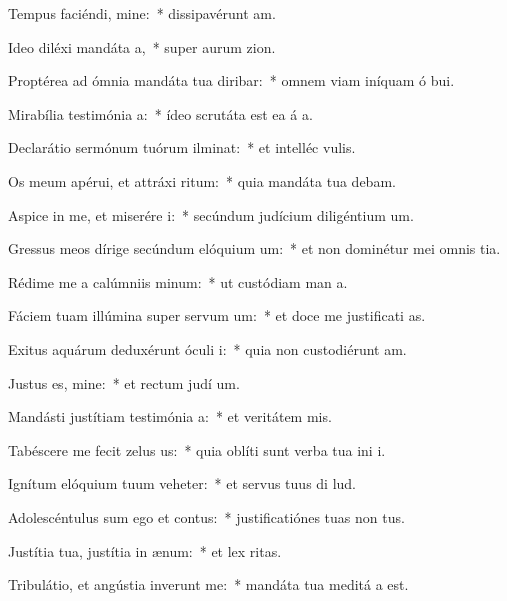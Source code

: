 \item Tempus faciéndi, mine:~* dissipavérunt  am.
\item Ideo diléxi mandáta a,~* super aurum  zion.
\item Proptérea ad ómnia mandáta tua diribar:~* omnem viam iníquam ó bui.
\item Mirabília testimónia a:~* ídeo scrutáta est ea á a.
\item Declarátio sermónum tuórum ilminat:~* et intelléc  vulis.
\item Os meum apérui, et attráxi ritum:~* quia mandáta tua debam.
\item Aspice in me, et miserére i:~* secúndum judícium diligéntium  um.
\item Gressus meos dírige secúndum elóquium um:~* et non dominétur mei omnis tia.
\item Rédime me a calúmniis minum:~* ut custódiam man a.
\item Fáciem tuam illúmina super servum um:~* et doce me justificati as.
\item Exitus aquárum deduxérunt óculi i:~* quia non custodiérunt  am.
\item Justus es, mine:~* et rectum judí um.
\item Mandásti justítiam testimónia a:~* et veritátem  mis.
\item Tabéscere me fecit zelus us:~* quia oblíti sunt verba tua ini i.
\item Ignítum elóquium tuum veheter:~* et servus tuus di lud.
\item Adolescéntulus sum ego et contus:~* justificatiónes tuas non  tus.
\item Justítia tua, justítia in ænum:~* et lex  ritas.
\item Tribulátio, et angústia inverunt me:~* mandáta tua meditá a est.
